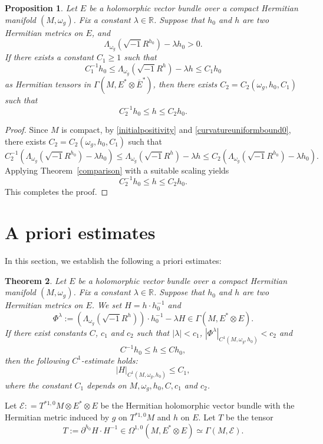 \documentclass[12pt, reqno]{amsart}
\newcommand\sE{{\mathscr E}}
\theoremstyle{plain}
\newtheorem{thm}{Theorem}[section]
\newtheorem{prop}[thm]{Proposition}
\theoremstyle{definition}
\newcommand{\btheorem}{\begin{thm}}
\newcommand{\etheorem}{\end{thm}}
\newcommand{\bproposition}{\begin{prop}}
\newcommand{\eproposition}{\end{prop}}
\newcommand{\bproof}{\begin{proof}}
\newcommand{\eproof}{\end{proof}}
\newcommand{\sq}{\sqrt{-1}}
\newcommand{\p}{\partial}
\renewcommand{\bar}{\overline}
\newcommand{\beq}{\begin{equation}}
\newcommand{\eeq}{\end{equation}}
\newcommand{\ts}{\otimes}
\renewcommand{\>}{\rightarrow}
\newcommand{\R}{{\mathbb R}}
\renewcommand{\>}{\rightarrow}
\renewcommand{\p}{{\partial}}
\renewcommand{\bar}{\overline}
\newcommand{\smo}{\sqrt{-1}}
\numberwithin{equation}{section} %
\begin{document}
\bproposition Let $E$ be a holomorphic vector bundle over  a compact Hermitian manifold $(M,\omega_g)$. Fix a constant $\lambda\in \R$. Suppose that $h_0$ and $h$ are two Hermitian metrics on $E$, and \beq \Lambda_{\omega_g}\left(\sq R^{{h_0}}\right)-\lambda h_0>0. \label{initialpositivity}\eeq
If there exists a constant  $C_1\geq 1 $ such that
\beq C_1^{-1} h_0\leq  \Lambda_{\omega_g}\left(\smo R^{{h}}\right)-\lambda h\leq C_1 h_0 \label{curvatureuniformbound0} \eeq
as Hermitian tensors in $\Gamma(M,E^*\ts  \bar E^*)$, then
there exists $C_2=C_2(\omega_g,  h_0, C_1)$ such that
\beq C_2^{-1}h_0 \leq h \leq C_2 h_0. \eeq
\eproposition
\bproof
Since $M$ is compact, by \eqref{initialpositivity} and \eqref{curvatureuniformbound0}, there exists $C_2=C_2(\omega_g,  h_0, C_1)$ such that
\beq C_2^{-1}\left(\Lambda_{\omega_g}\left(\sq R^{h_0}\right) - \lambda h_0\right)\leq \Lambda_{\omega_g}\left(\sq R^{h}\right) - \lambda h\leq C_2\left(\Lambda_{\omega_g}\left(\sq R^{h_0}\right) - \lambda h_0\right).\eeq
Applying Theorem~\ref{comparison} with a suitable scaling yields
\beq C_2^{-1}h_0 \leq h \leq C_2 h_0. \eeq
This completes the proof.
\eproof


\baselineskip


\section{A priori estimates}

In this section, we establish the following a priori estimates:
\btheorem\label{C1estimate} Let $E$ be a holomorphic vector bundle over  a compact Hermitian manifold $(M,\omega_g)$. Fix a constant $\lambda\in \R$.  Suppose that $h_0$ and $h$ are two Hermitian metrics on $E$.  We set $H=h\cdot h_0^{-1}$ and
\beq \Phi^\lambda:=  \left(\Lambda_{\omega_g}\left(\smo R^{{h}}\right)\right)\cdot h_0^{-1}-\lambda H \in \Gamma(M,E^*\ts E).\eeq
If there exist constants  $C$, $c_1$ and $c_2$ such that $|\lambda|<c_1$, $|\Phi^\lambda|_{C^1(M,\omega_g, h_0)}<c_2$
and \beq C^{-1} h_0 \leq  h\leq C h_0, \label{curvatureuniformbound} \eeq
then  the following  $C^1$-estimate holds:
\beq  |H|_{C^1(M,\omega_g, h_0)}\leq C_1,\eeq
where the constant $C_1$ depends on $M,\omega_g,  h_0, C, c_1$ and $c_2$.
\etheorem


Let $ \sE: = T^{*1,0}M \otimes E^* \otimes E $ be the Hermitian holomorphic vector bundle with the Hermitian metric induced by $ g $ on $ T^{*1,0}M $ and $ h $ on $ E $.  Let  $ T $ be the tensor
\beq T := \p^{h_0}H \cdot H^{-1}  \in \Omega^{1,0}(M,E^*\otimes E) \simeq \Gamma(M,\sE). \eeq
\end{document}
